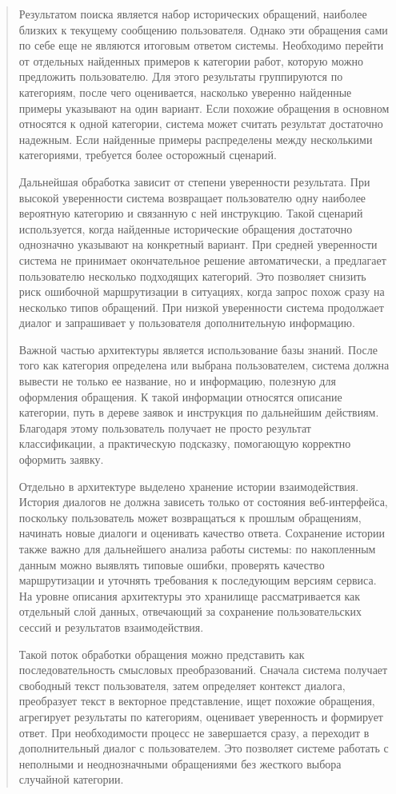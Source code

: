 \begin{quote}
Результатом поиска является набор исторических обращений, наиболее
близких к текущему сообщению пользователя. Однако эти обращения сами по
себе еще не являются итоговым ответом системы. Необходимо перейти от
отдельных найденных примеров к категории работ, которую можно предложить
пользователю. Для этого результаты группируются по категориям, после
чего оценивается, насколько уверенно найденные примеры указывают на один
вариант. Если похожие обращения в основном относятся к одной категории,
система может считать результат достаточно надежным. Если найденные
примеры распределены между несколькими категориями, требуется более
осторожный сценарий.

Дальнейшая обработка зависит от степени уверенности результата. При
высокой уверенности система возвращает пользователю одну наиболее
вероятную категорию и связанную с ней инструкцию. Такой сценарий
используется, когда найденные исторические обращения достаточно
однозначно указывают на конкретный вариант. При средней уверенности
система не принимает окончательное решение автоматически, а предлагает
пользователю несколько подходящих категорий. Это позволяет снизить риск
ошибочной маршрутизации в ситуациях, когда запрос похож сразу на
несколько типов обращений. При низкой уверенности система продолжает
диалог и запрашивает у пользователя дополнительную информацию.

Важной частью архитектуры является использование базы знаний. После того
как категория определена или выбрана пользователем, система должна
вывести не только ее название, но и информацию, полезную для оформления
обращения. К такой информации относятся описание категории, путь в
дереве заявок и инструкция по дальнейшим действиям. Благодаря этому
пользователь получает не просто результат классификации, а практическую
подсказку, помогающую корректно оформить заявку.

Отдельно в архитектуре выделено хранение истории взаимодействия. История
диалогов не должна зависеть только от состояния веб-интерфейса,
поскольку пользователь может возвращаться к прошлым обращениям, начинать
новые диалоги и оценивать качество ответа. Сохранение истории также
важно для дальнейшего анализа работы системы: по накопленным данным
можно выявлять типовые ошибки, проверять качество маршрутизации и
уточнять требования к последующим версиям сервиса. На уровне описания
архитектуры это хранилище рассматривается как отдельный слой данных,
отвечающий за сохранение пользовательских сессий и результатов
взаимодействия.

Такой поток обработки обращения можно представить как последовательность
смысловых преобразований. Сначала система получает свободный текст
пользователя, затем определяет контекст диалога, преобразует текст в
векторное представление, ищет похожие обращения, агрегирует результаты
по категориям, оценивает уверенность и формирует ответ. При
необходимости процесс не завершается сразу, а переходит в дополнительный
диалог с пользователем. Это позволяет системе работать с неполными и
неоднозначными обращениями без жесткого выбора случайной категории.


\end{quote}
